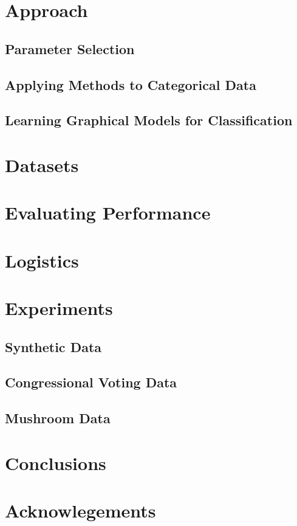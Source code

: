 \documentclass[11pt]{article}
\begin{document}
\section{Approach}
\subsection{Parameter Selection}
\subsection{Applying Methods to Categorical Data}
\subsection{Learning Graphical Models for Classification}
\section{Datasets}
\section{Evaluating Performance}
\section{Logistics}
\section{Experiments}
\subsection{Synthetic Data}
\subsection{Congressional Voting Data}
\subsection{Mushroom Data}
\section{Conclusions}
\section{Acknowlegements}


{}

\end{document}
